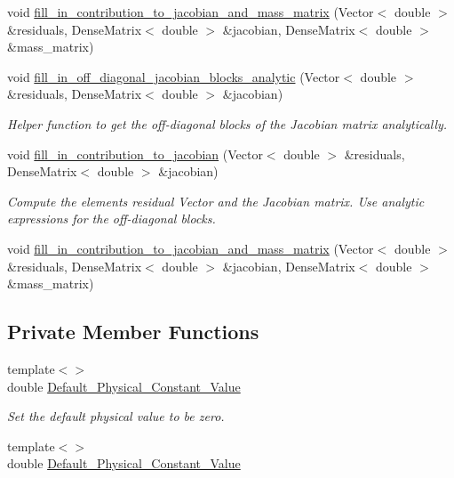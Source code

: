\begin{DoxyCompactItemize}
void \hyperlink{classoomph_1_1BuoyantQCrouzeixRaviartElement_a7d22156d87949e4c64d597d60fe00225}{fill\+\_\+in\+\_\+contribution\+\_\+to\+\_\+jacobian\+\_\+and\+\_\+mass\+\_\+matrix} (Vector$<$ double $>$ \&residuals, Dense\+Matrix$<$ double $>$ \&jacobian, Dense\+Matrix$<$ double $>$ \&mass\+\_\+matrix)
\item 
void \hyperlink{classoomph_1_1BuoyantQCrouzeixRaviartElement_aa344d9c1a36501baefc4afd56f227b94}{fill\+\_\+in\+\_\+off\+\_\+diagonal\+\_\+jacobian\+\_\+blocks\+\_\+analytic} (Vector$<$ double $>$ \&residuals, Dense\+Matrix$<$ double $>$ \&jacobian)
\begin{DoxyCompactList}\small\item\em Helper function to get the off-\/diagonal blocks of the Jacobian matrix analytically. \end{DoxyCompactList}\item 
void \hyperlink{classoomph_1_1BuoyantQCrouzeixRaviartElement_a7bd9313dd697c1219cee4a65692388b5}{fill\+\_\+in\+\_\+contribution\+\_\+to\+\_\+jacobian} (Vector$<$ double $>$ \&residuals, Dense\+Matrix$<$ double $>$ \&jacobian)
\begin{DoxyCompactList}\small\item\em Compute the element\textquotesingle{}s residual Vector and the Jacobian matrix. Use analytic expressions for the off-\/diagonal blocks. \end{DoxyCompactList}\item 
void \hyperlink{classoomph_1_1BuoyantQCrouzeixRaviartElement_a7d22156d87949e4c64d597d60fe00225}{fill\+\_\+in\+\_\+contribution\+\_\+to\+\_\+jacobian\+\_\+and\+\_\+mass\+\_\+matrix} (Vector$<$ double $>$ \&residuals, Dense\+Matrix$<$ double $>$ \&jacobian, Dense\+Matrix$<$ double $>$ \&mass\+\_\+matrix)
\end{DoxyCompactItemize}
\subsection*{Private Member Functions}
\begin{DoxyCompactItemize}
\item 
{\footnotesize template$<$$>$ }\\double \hyperlink{classoomph_1_1BuoyantQCrouzeixRaviartElement_a37e9dc4e6e5a8120a2f27587b5853086}{Default\+\_\+\+Physical\+\_\+\+Constant\+\_\+\+Value}
\begin{DoxyCompactList}\small\item\em Set the default physical value to be zero. \end{DoxyCompactList}\item 
{\footnotesize template$<$$>$ }\\double \hyperlink{classoomph_1_1BuoyantQCrouzeixRaviartElement_a74cccd0d2c7e943221f338fded0c18db}{Default\+\_\+\+Physical\+\_\+\+Constant\+\_\+\+Value}
\end{DoxyCompactItemize}

